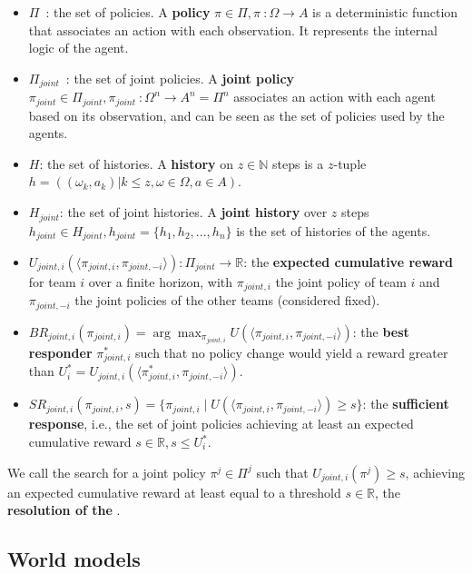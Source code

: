 \begin{itemize}
  \item $\Pi$~: the set of policies. A \textbf{policy} $\pi \in \Pi, \pi~: \Omega \rightarrow A$ is a deterministic function that associates an action with each observation. It represents the internal logic of the agent.
  \item $\Pi_{joint}$~: the set of joint policies. A \textbf{joint policy} $\pi_{joint} \in \Pi_{joint}, \pi_{joint}~: \Omega^n \rightarrow A^n = \Pi^n$ associates an action with each agent based on its observation, and can be seen as the set of policies used by the agents.
  \item $H$: the set of histories. A \textbf{history} on $z \in \mathbb{N}$ steps is a $z$-tuple $h = ((\omega_k, a_k) | k \leq z, \omega \in \Omega, a \in A)$.
  \item $H_{joint}$: the set of joint histories. A \textbf{joint history} over $z$ steps $h_{joint} \in H_{joint}, h_{joint} = \{h_1, h_2, ..., h_n\}$ is the set of histories of the agents.
  \item $U_{joint,i}(\langle \pi_{joint,i}, \pi_{joint,-i} \rangle) : \Pi_{joint} \rightarrow \mathbb{R}$: the \textbf{expected cumulative reward} for team $i$ over a finite horizon, with $\pi_{joint,i}$ the joint policy of team $i$ and $\pi_{joint,-i}$ the joint policies of the other teams (considered fixed).
  \item $BR_{joint,i}(\pi_{joint,i}) = \arg\max_{\pi_{joint,i}} U(\langle \pi_{joint,i}, \pi_{joint,-i} \rangle)$: the \textbf{best responder} $\pi^*_{joint,i}$ such that no policy change would yield a reward greater than $U^*_i = U_{joint,i}(\langle \pi^*_{joint,i}, \pi_{joint,-i} \rangle)$.
  \item $SR_{joint,i}(\pi_{joint,i}, s) = \{\pi_{joint,i} \mid U(\langle \pi_{joint,i}, \pi_{joint,-i} \rangle) \geq s\}$: the \textbf{sufficient response}, i.e., the set of joint policies achieving at least an expected cumulative reward $s \in \mathbb{R}, s \leq U^*_i$.
\end{itemize}

We call the search for a joint policy $\pi^j \in \Pi^j$ such that $U_{joint,i}(\pi^j) \geq s$, achieving an expected cumulative reward at least equal to a threshold $s \in \mathbb{R}$, the \textbf{resolution of the }.



\subsection{World models}

